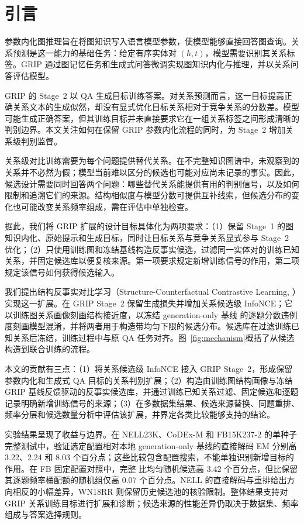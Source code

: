 \section{引言}

参数内化图推理旨在将图知识写入语言模型参数，使模型能够直接回答图查询。关系预测是这一能力的基础任务：给定有序实体对 $(h,t)$，模型需要识别其关系标签。GRIP 通过图记忆任务和生成式问答微调实现图知识内化与推理，并以关系问答评估模型\citep{feng2026grip}。

GRIP 的 Stage~2 以 QA 生成目标训练答案。对关系预测而言，这一目标提高正确关系文本的生成似然，却没有显式优化目标关系相对于竞争关系的分数差。模型可能生成正确答案，但其训练目标并未直接要求它在一组关系标签之间形成清晰的判别边界。本文关注如何在保留 GRIP 参数内化流程的同时，为 Stage~2 增加关系级判别监督。

关系级对比训练需要为每个问题提供替代关系。在不完整知识图谱中，未观察到的关系并不必然为假；模型当前难以区分的候选也可能对应尚未记录的事实\citep{ji2022survey,hogan2021kg}。因此，候选设计需要同时回答两个问题：哪些替代关系能提供有用的判别信号，以及如何限制和追溯它们的来源。结构相似度与模型分数可提供互补线索，但候选分布的变化也可能改变关系频率组成，需在评估中单独检查。

据此，我们将 GRIP 扩展的设计目标具体化为两项要求：（1）保留 Stage~1 的图知识内化、原始提示和生成目标，同时让目标关系与竞争关系显式参与 Stage~2 优化；（2）只使用训练图和冻结基线构造反事实候选，过滤同一实体对的训练已知关系，并固定候选库以便复核来源。第一项要求规定新增训练信号的作用，第二项规定该信号如何获得候选输入。

我们提出结构反事实对比学习（Structure-Counterfactual Contrastive Learning, \scc）实现这一扩展。\scc{}在 GRIP Stage~2 保留生成损失并增加关系候选级 InfoNCE；它以训练图关系画像刻画结构接近度，以冻结 generation-only 基线 \bone{} 的逐题分数违例度刻画模型混淆，并将两者用于构造带均匀下限的候选分布。候选库在过滤训练已知关系后冻结，训练过程中与原 QA 任务对齐。图~\ref{fig:mechanism}概括了从候选构造到联合训练的流程。

本文的贡献有三点：（1）将关系候选级 InfoNCE 接入 GRIP Stage~2，形成保留参数内化和生成式 QA 目标的关系判别扩展；（2）构造由训练图结构画像与冻结 GRIP 基线反馈驱动的反事实候选库，并通过训练已知关系过滤、固定候选和逐题记录明确新增训练信号的来源；（3）在多数据集结果、候选来源替换、同题重排、频率分层和候选数量分析中评估该扩展，并界定各类比较能够支持的结论。

实验结果呈现了收益与边界。在 NELL23K、CoDEx-M 和 FB15K237-2 的单种子完整测试中，验证选定配置相对本地 generation-only 基线的直接解码 EM 分别高 3.22、2.24 和 8.03 个百分点；这些比较包含配置搜索，不能单独识别新增目标的作用。在 FB 固定配置对照中，完整 \scc{} 比均匀随机候选高 3.42 个百分点，但比保留其逐题频率桶配额的随机组仅高 0.07 个百分点。NELL 的直接解码与重排给出方向相反的小幅差异，WN18RR 则保留历史候选池的核验限制。整体结果支持对 GRIP 关系训练目标进行扩展和诊断；候选来源的性能差异仍取决于数据集、频率组成与答案选择规则。
